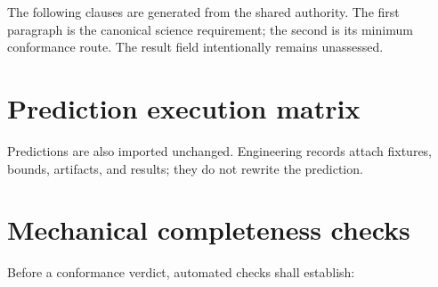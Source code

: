 \documentclass[10pt]{article}
\newcommand{\MaybeRequirementBreak}[1]{%
  \ifcsname SCIMapRequirementBreak#1\endcsname
    \csname SCIMapRequirementBreak#1\endcsname
  \fi}
\newcommand{\MaybePredictionBreak}[1]{%
  \ifcsname SCIMapPredictionBreak#1\endcsname
    \csname SCIMapPredictionBreak#1\endcsname
  \fi}
\begin{document}
The following clauses are generated from the shared authority. The first
paragraph is the canonical science requirement; the second is its minimum
conformance route. The result field intentionally remains unassessed.

\renewcommand{\SCIMapRequirement}[4]{%
  \MaybeRequirementBreak{#1}%
  \phantomsection\label{engreq:#1}%
  \noindent\textbf{\textcolor{EngNavy}{#1} -- #2}\par
  \textbf{Canonical clause:} #3\par
  \textbf{Minimum conformance evidence:} #4\par
  \textbf{Result:} \textcolor{EngGray}{UNASSESSED}\par
  \smallskip\hrule\smallskip}
\begin{sloppypar}\small
\SCIMapRequirements
\end{sloppypar}\normalsize

\clearpage
\section{Prediction execution matrix}\label{sec:predictions}

Predictions are also imported unchanged. Engineering records attach fixtures,
bounds, artifacts, and results; they do not rewrite the prediction.

\renewcommand{\SCIMapPrediction}[4]{%
  \MaybePredictionBreak{#1}%
  \phantomsection\label{engpred:#1}%
  \noindent\textbf{\textcolor{EngNavy}{#1} -- #2}\par
  \textbf{Canonical prediction:} #3\par
  \textbf{Primary claim layer:} #4.\par
  \textbf{Fixture / bound / result:} \textcolor{EngGray}{TO BE PREREGISTERED}\par
  \smallskip\hrule\smallskip}
\SCIMapPredictions

\clearpage
\section{Mechanical completeness checks}

Before a conformance verdict, automated checks shall establish:
\end{document}
